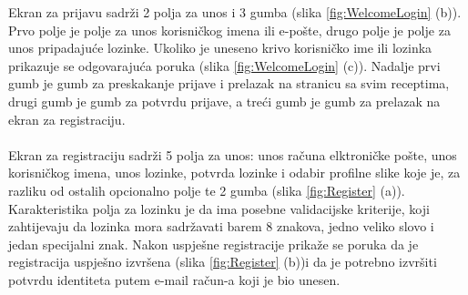 \documentclass[times, utf8, zavrsni]{fer}
\begin{document}
Ekran za prijavu sadrži 2 polja za unos i 3 gumba (slika \ref{fig:WelcomeLogin} (b)). Prvo polje je polje za unos
korisničkog imena ili e-pošte, drugo polje je polje za unos pripadajuće lozinke. Ukoliko je uneseno
krivo korisničko ime ili lozinka prikazuje se odgovarajuća poruka (slika \ref{fig:WelcomeLogin} (c)). Nadalje
prvi gumb je gumb za preskakanje prijave i prelazak na stranicu sa svim receptima, drugi gumb je gumb
za potvrdu prijave, a treći gumb je gumb za prelazak na ekran za registraciju.
\\\\
Ekran za registraciju sadrži 5 polja za unos: unos računa elktroničke pošte, unos
korisničkog imena, unos lozinke, potvrda lozinke i odabir profilne slike koje je, za
razliku od ostalih opcionalno polje te 2 gumba (slika \ref{fig:Register} (a)). Karakteristika polja za lozinku je da ima posebne
validacijske kriterije, koji zahtijevaju da lozinka mora
sadržavati barem 8 znakova, jedno veliko slovo i jedan specijalni znak. Nakon uspješne registracije
prikaže se poruka da je registracija uspješno izvršena (slika \ref{fig:Register} (b))i da je potrebno izvršiti potvrdu identiteta
putem e-mail račun-a koji je bio unesen.
\end{document}
